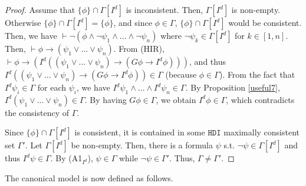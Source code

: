 \documentclass{article}
\begin{document}
\begin{proof}

Assume that $\{\phi\} \cap \Gamma[I^{d}]$ is inconsistent. Then, $\Gamma[I^{d}]$ is non-empty. Otherwise $\{\phi\} \cap \Gamma[I^{d}] = \{\phi\}$, and since $\phi \in \Gamma$, $\{\phi\} \cap \Gamma[I^{d}]$ would be consistent. Then, we have $\vdash \neg (\phi \wedge \neg \psi_{1} \wedge ... \wedge \neg \psi_{n})$ where $\neg \psi_{k} \in \Gamma[I^{d}]$ for $k \in [1,n]$. Then, $\vdash \phi \rightarrow (\psi_{1} \vee ... \vee \psi_{n})$. From (HIR), $\vdash \phi \rightarrow (I^{d}(( \psi_{1} \vee ... \vee \psi_{n}) \rightarrow (G \phi \rightarrow I^{d} \phi)))$, and thus $I^{d}(( \psi_{1} \vee ... \vee \psi_{n}) \rightarrow (G \phi \rightarrow I^{d} \phi)) \in \Gamma$ (because $\phi \in \Gamma$). From the fact that $I^{d} \psi_{i} \in \Gamma$ for each $\psi_{i}$, we have $I^{d} \psi_{1} \wedge ... \wedge I^{d} \psi_{n} \in \Gamma$. By Proposition \ref{useful7}, $I^{d}(\psi_{1} \vee ... \vee \psi_{n}) \in \Gamma$. By having $G\phi \in \Gamma$, we obtain $I^{d} \phi \in \Gamma$, which contradicts the consistency of $\Gamma$.

Since $\{\phi\} \cap \Gamma[I^{d}]$ is consistent, it is contained in some $\mathtt{HDI}$ maximally consistent set $\Gamma'$. Let $\Gamma[I^{d}]$ be non-empty. Then, there is a formula $\psi$ s.t. $\neg \psi \in \Gamma[I^{d}]$ and thus $I^{d} \psi \in \Gamma$. By (A1$_{I^{d}}$), $\psi \in \Gamma$ while $\neg \psi \in \Gamma'$. Thus, $\Gamma \not = \Gamma'$.

\end{proof}

The canonical model is now defined as follows.
\end{document}
